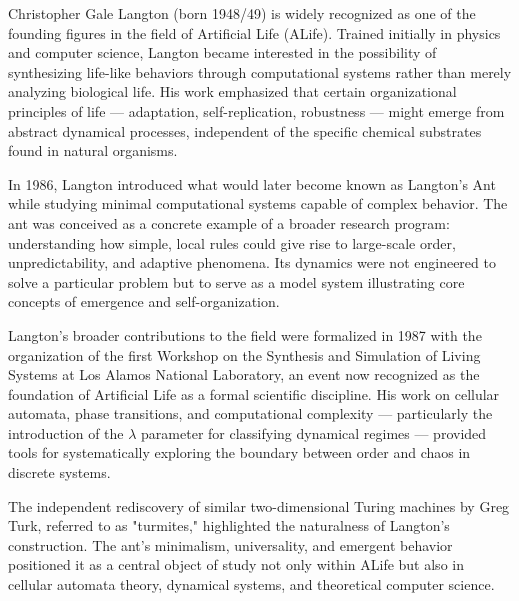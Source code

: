 \begin{historical}
Christopher Gale Langton (born 1948/49) is widely recognized as one of the founding figures in the field of Artificial Life (ALife). Trained initially in physics and computer science, Langton became interested in the possibility of synthesizing life-like behaviors through computational systems rather than merely analyzing biological life. His work emphasized that certain organizational principles of life — adaptation, self-replication, robustness — might emerge from abstract dynamical processes, independent of the specific chemical substrates found in natural organisms.

In 1986, Langton introduced what would later become known as Langton's Ant while studying minimal computational systems capable of complex behavior. The ant was conceived as a concrete example of a broader research program: understanding how simple, local rules could give rise to large-scale order, unpredictability, and adaptive phenomena. Its dynamics were not engineered to solve a particular problem but to serve as a model system illustrating core concepts of emergence and self-organization.

Langton’s broader contributions to the field were formalized in 1987 with the organization of the first Workshop on the Synthesis and Simulation of Living Systems at Los Alamos National Laboratory, an event now recognized as the foundation of Artificial Life as a formal scientific discipline. His work on cellular automata, phase transitions, and computational complexity — particularly the introduction of the $\lambda$ parameter for classifying dynamical regimes — provided tools for systematically exploring the boundary between order and chaos in discrete systems.

The independent rediscovery of similar two-dimensional Turing machines by Greg Turk, referred to as "turmites," highlighted the naturalness of Langton's construction. The ant’s minimalism, universality, and emergent behavior positioned it as a central object of study not only within ALife but also in cellular automata theory, dynamical systems, and theoretical computer science.
\end{historical}
